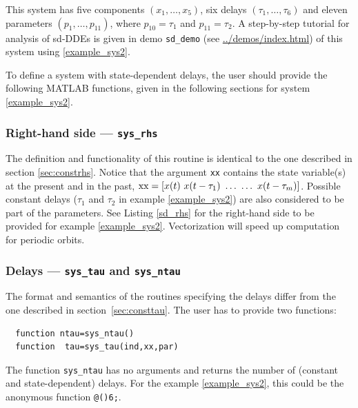 \documentclass[10pt]{scrartcl}
\newcommand{\demobase}{\url{../demos/index.html}}
\newcommand{\blist}[1]{\mbox{\lstinline!#1!}}
\begin{document}
This system has five components $(x_1,\ldots,x_5)$, six delays
$(\tau_1,\ldots,\tau_6)$ and eleven parameters $(p_1,\ldots,p_{11})$,
where $p_{10}=\tau_1$ and $p_{11}=\tau_2$.  A step-by-step tutorial
for analysis of sd-DDEs is given in demo \texttt{sd\_demo} (see
\demobase{}) of this system using \eqref{example_sys2}.

To define a system with state-dependent delays, the user should
provide the following MATLAB functions, given in the following
sections for system \eqref{example_sys2}.


\subsubsection{Right-hand side --- \texorpdfstring{\blist{sys_rhs}}{sys\_rhs}}
\label{sec:sdrhs}
The definition and functionality of this routine is identical to the
one described in section \ref{sec:constrhs}.  Notice that the argument
\blist{xx} contains the state variable(s) at the present and in the
past, $\blist{xx}=[x(t)\ x(t-\tau_1)\ \ldots\ \ldots\ x(t-\tau_m)]$.
Possible constant delays ($\tau_1$ and $\tau_2$ in example
\eqref{example_sys2}) are also considered to be part of the
parameters. See Listing \ref{sd_rhs} for the right-hand side to be
provided for example \eqref{example_sys2}. Vectorization will speed up
computation for periodic orbits.


\subsubsection{Delays --- \texorpdfstring{\blist{sys_tau}}{sys\_tau} and \texorpdfstring{\blist{sys_ntau}}{sys\_ntau}}
\label{sec:sdtau}
The format and semantics of the routines specifying the delays differ
from the one described in section~\ref{sec:consttau}. The user has to provide two functions:
\begin{lstlisting}
  function ntau=sys_ntau()        
  function  tau=sys_tau(ind,xx,par)
\end{lstlisting}
The function \blist{sys_ntau} has no arguments and  returns the number of (constant and state-dependent) delays. For the example \eqref{example_sys2}, this could be the anonymous function \blist{@()6;}.
\end{document}
